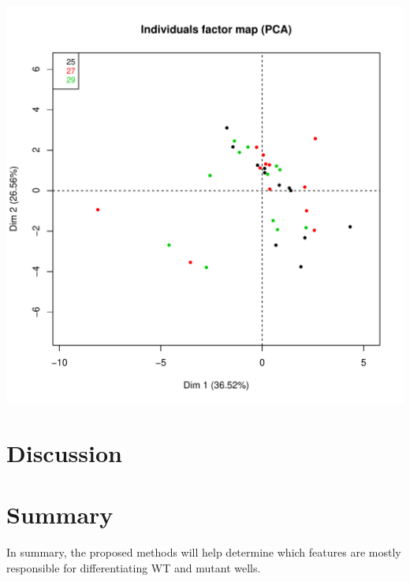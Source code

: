 \documentclass{article}\usepackage[]{graphicx}\usepackage[]{color}
\makeatletter
\def\maxwidth{ %
  \ifdim\Gin@nat@width>\linewidth
    \linewidth
  \else
    \Gin@nat@width
  \fi
}
\newenvironment{kframe}{%
 \def\at@end@of@kframe{}%
 \ifinner\ifhmode%
  \def\at@end@of@kframe{\end{minipage}}%
  \begin{minipage}{\columnwidth}%
 \fi\fi%
 \def\FrameCommand##1{\hskip\@totalleftmargin \hskip-\fboxsep
 \colorbox{shadecolor}{##1}\hskip-\fboxsep
     \hskip-\linewidth \hskip-\@totalleftmargin \hskip\columnwidth}%
 \MakeFramed {\advance\hsize-\width
   \@totalleftmargin\z@ \linewidth\hsize
   \@setminipage}}%
 {\par\unskip\endMakeFramed%
 \at@end@of@kframe}
\newenvironment{knitrout}{}{} %
\makeatother
\begin{document}
  
  
\begin{knitrout}
\color{fgcolor}\begin{kframe}


{\ttfamily\noindent\itshape\color{messagecolor}{\#\# Loading required package: meaRtools}}\end{kframe}
\end{knitrout}
  


  

\begin{knitrout}
\color{fgcolor}

{\centering \includegraphics[width=\maxwidth]{figure/minimal-pca1-1} 

}



\end{knitrout}







\section{Discussion}


\section{Summary}
In summary, the proposed methods will help determine which features are mostly responsible for differentiating WT and mutant wells.
\end{document}
